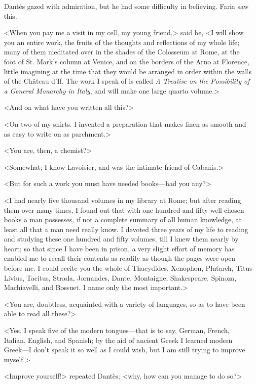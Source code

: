  Dantès gazed with admiration, but he had some difficulty in believing. Faria saw this. 

 <When you pay me a visit in my cell, my young friend,> said he, <I will show you an entire work, the fruits of the thoughts and reflections of my whole life; many of them meditated over in the shades of the Colosseum at Rome, at the foot of St. Mark's column at Venice, and on the borders of the Arno at Florence, little imagining at the time that they would be arranged in order within the walls of the Château d'If. The work I speak of is called \textit{A Treatise on the Possibility of a General Monarchy in Italy}, and will make one large quarto volume.> 

 <And on what have you written all this?> 

 <On two of my shirts. I invented a preparation that makes linen as smooth and as easy to write on as parchment.> 

 <You are, then, a chemist?> 

 <Somewhat; I know Lavoisier, and was the intimate friend of Cabanis.> 

 <But for such a work you must have needed books—had you any?> 

 <I had nearly five thousand volumes in my library at Rome; but after reading them over many times, I found out that with one hundred and fifty well-chosen books a man possesses, if not a complete summary of all human knowledge, at least all that a man need really know. I devoted three years of my life to reading and studying these one hundred and fifty volumes, till I knew them nearly by heart; so that since I have been in prison, a very slight effort of memory has enabled me to recall their contents as readily as though the pages were open before me. I could recite you the whole of Thucydides, Xenophon, Plutarch, Titus Livius, Tacitus, Strada, Jornandes, Dante, Montaigne, Shakespeare, Spinoza, Machiavelli, and Bossuet. I name only the most important.> 

 <You are, doubtless, acquainted with a variety of languages, so as to have been able to read all these?> 

 <Yes, I speak five of the modern tongues—that is to say, German, French, Italian, English, and Spanish; by the aid of ancient Greek I learned modern Greek—I don't speak it so well as I could wish, but I am still trying to improve myself.> 

 <Improve yourself!> repeated Dantès; <why, how can you manage to do so?> 

